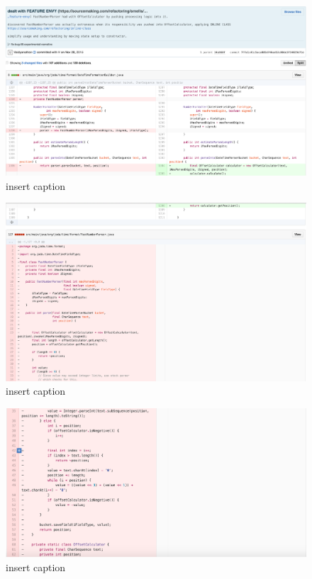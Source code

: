 \begin{figure}[H]
	\centering
	\includegraphics[width=\linewidth]{code22}
	\caption{insert caption}
\end{figure}
\begin{figure}[H]
	\centering
	\includegraphics[width=\linewidth]{code23}
	\caption{insert caption}
\end{figure}
\begin{figure}[H]
	\centering
	\includegraphics[width=\linewidth]{code24}
	\caption{insert caption}
\end{figure}
